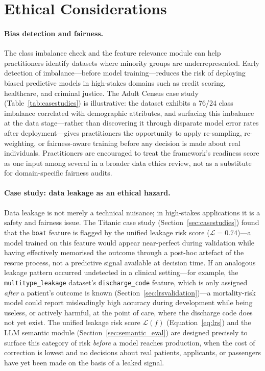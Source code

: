 \documentclass[12pt,a4paper]{report}
\begin{document}
\section{Ethical Considerations}

\paragraph{Bias detection and fairness.}  The class imbalance check and the feature
relevance module can help practitioners identify datasets where minority groups are
underrepresented.  Early detection of imbalance---before model training---reduces the risk
of deploying biased predictive models in high-stakes domains such as credit scoring,
healthcare, and criminal justice.  The Adult Census case study (Table~\ref{tab:casestudies})
is illustrative: the dataset exhibits a 76/24 class imbalance correlated with demographic
attributes, and surfacing this imbalance at the data stage---rather than discovering it
through disparate model error rates after deployment---gives practitioners the opportunity
to apply re-sampling, re-weighting, or fairness-aware training before any decision is made
about real individuals.  Practitioners are encouraged to treat the framework's readiness
score as one input among several in a broader data ethics review, not as a substitute for
domain-specific fairness audits.

\paragraph{Case study: data leakage as an ethical hazard.}  Data leakage is not merely a
technical nuisance; in high-stakes applications it is a safety and fairness issue.  The
Titanic case study (Section~\ref{sec:casestudies}) found that the \texttt{boat} feature is
flagged by the unified leakage risk score ($\mathcal{L}{=}0.74$)---a model trained on this
feature would appear near-perfect during validation while having effectively memorised the
outcome through a post-hoc artefact of the rescue process, not a predictive signal
available at decision time.
If an analogous leakage pattern occurred undetected in a clinical setting---for example, the
\texttt{multitype\_leakage} dataset's \texttt{discharge\_code} feature, which is only
assigned \emph{after} a patient's outcome is known (Section~\ref{sec:lrsvalidation})---a
mortality-risk model could report misleadingly high accuracy during development while being
useless, or actively harmful, at the point of care, where the discharge code does not yet
exist.  The unified leakage risk score $\mathcal{L}(f)$ (Equation~\eqref{eq:lrs}) and the
LLM semantic module (Section~\ref{sec:semantic_eval}) are designed precisely to
surface this category of risk \emph{before} a model reaches production, when the cost of
correction is lowest and no decisions about real patients, applicants, or passengers have
yet been made on the basis of a leaked signal.
\end{document}
